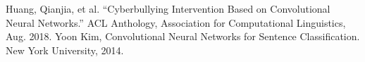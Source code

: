 \documentclass[conference]{IEEEtran}
\begin{document}
\begin{thebibliography}{00}
 Huang, Qianjia, et al. “Cyberbullying Intervention Based on Convolutional Neural Networks.” ACL Anthology, Association for Computational Linguistics, Aug. 2018.
 Yoon Kim, Convolutional Neural Networks for Sentence Classification. New York University, 2014.
\end{thebibliography}
\end{document}
